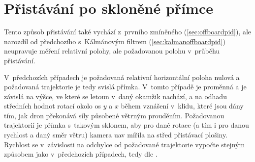     \section{Přistávání po skloněné přímce} \label{sec:offboardpidangle}
        Tento způsob přistávání také vychází z~prvního zmíněného (\cref{sec:offboardpid}), ale narozdíl od předchozího s~Kálmánovým filtrem (\cref{sec:kalmanoffboardpid}) neupravuje měření relativní polohy, ale požadovanou polohu v~průběhu přistávání.
        
        V~předchozích případech je požadovaná relativní horizontální poloha nulová a požadovaná trajektorie je tedy svislá přímka. V~tomto případě je proměnná a je závislá na výšce, ve které se letoun v~daný okamžik nachází, a na odhadu středních hodnot rotací okolo os $y$ a $x$ během vznášení v~klidu, které jsou dány tím, jak dron překonává síly působené větrným prouděním. Požadovanou trajektorií je přímka s~takovým sklonem, aby pro dané rotace (a tím i pro danou rychlost a daný směr větru) kamera \acrshort{uav} mířila na střed přistávací plošiny. Rychlost se v~závislosti na odchylce od požadované trajektorie vypočte stejným způsobem jako v~předchozích případech, tedy dle .

